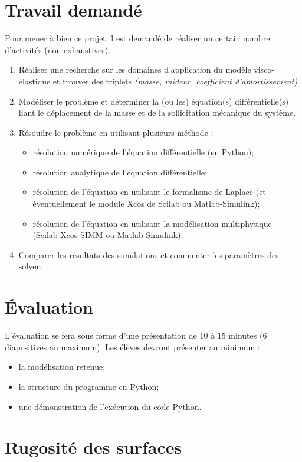 \documentclass[10pt]{article}
\begin{document}
\section{Travail demandé}
Pour mener à bien ce projet il est demandé de réaliser un certain nombre d'activités (non exhaustives).
\begin{enumerate}
\item Réaliser une recherche sur les domaines d'application du modèle visco-élastique et trouver des triplets \textit{(masse, raideur, coefficient d'amortissement)}
\item Modéliser le problème et déterminer la (ou les) équation(s) différentielle(s) liant le déplacement de la masse et de la sollicitation mécanique du système.
\item Résoudre le problème en utilisant plusieurs méthode : 
\begin{itemize}
\item résolution numérique de l'équation différentielle (en Python);
\item résolution analytique de l'équation différentielle;
\item résolution de l'équation en utilisant le formalisme de Laplace (et éventuellement le module Xcos de Scilab ou Matlab-Simulink);
\item résolution de l'équation en utilisant la modélisation multiphysique (Scilab-Xcos-SIMM ou Matlab-Simulink).
\end{itemize}
\item Comparer les résultats des simulations et commenter les paramètres des solver.
\end{enumerate}

\section{Évaluation}
L'évaluation se fera sous forme d'une présentation de 10 à 15 minutes (6 diapositives au maximum). Les élèves devront présenter au minimum : 
\begin{itemize}
\item la modélisation retenue;
\item la structure du programme en Python;
\item une démonstration de l'exécution du code Python.
\end{itemize}


\section{Rugosité des surfaces}
\end{document}
